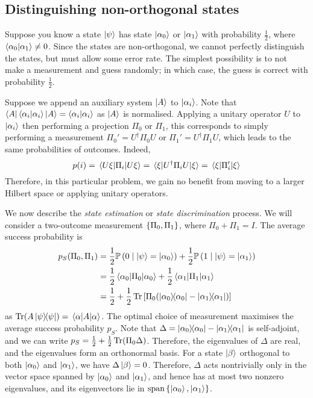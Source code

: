 \subsection{Distinguishing non-orthogonal states}
Suppose you know a state \( \ket{\psi} \) has state \( \ket{\alpha_0} \) or \( \ket{\alpha_1} \) with probability \( \frac{1}{2} \), where \( \ip{\alpha_0}{\alpha_1} \neq 0 \).
Since the states are non-orthogonal, we cannot perfectly distinguish the states, but must allow some error rate.
The simplest possibility is to not make a measurement and guess randomly; in which case, the guess is correct with probability \( \frac{1}{2} \).

Suppose we append an auxiliary system \( \ket{A} \) to \( \ket{\alpha_i} \).
Note that \( \bra{A}\bra{\alpha_i}\ket{\alpha_i}\ket{A} = \ip{\alpha_i}{\alpha_i} \) as \( \ket{A} \) is normalised.
Applying a unitary operator \( U \) to \( \ket{\alpha_i} \) then performing a projection \( \Pi_0 \) or \( \Pi_1 \), this corresponds to simply performing a measurement \( \Pi_0' = U^\dagger \Pi_0 U \) or \( \Pi_1' = U^\dagger \Pi_1 U \), which leads to the same probabilities of outcomes.
Indeed,
\[ p(i) = \ev{\Pi_i}{U\xi} = \ev{U^\dagger \Pi_i U}{\xi} = \ev{\Pi_i'}{\xi} \]
Therefore, in this particular problem, we gain no benefit from moving to a larger Hilbert space or applying unitary operators.

We now describe the \emph{state estimation} or \emph{state discrimination} process.
We will consider a two-outcome measurement \( \qty{\Pi_0, \Pi_1} \), where \( \Pi_0 + \Pi_1 = I \).
The average success probability is
\begin{align*}
    p_S(\Pi_0, \Pi_1) &= \frac{1}{2} \prob{0 \mid \ket{\psi} = \ket{\alpha_0}} + \frac{1}{2} \prob{1 \mid \ket{\psi} = \ket{\alpha_1}} \\
    &= \frac{1}{2}\ev{\Pi_0}{\alpha_0} + \frac{1}{2}\ev{\Pi_1}{\alpha_1} \\
    &= \frac{1}{2} + \frac{1}{2} \Tr \qty[\Pi_0 \qty(\op{\alpha_0}{\alpha_0} - \op{\alpha_1}{\alpha_1})]
\end{align*}
as \( \Tr(A\op{\psi}{\psi}) = \ev{A}{\alpha} \).
The optimal choice of measurement maximises the average success probability \( p_S \).
Note that \( \Delta = \op{\alpha_0}{\alpha_0} - \op{\alpha_1}{\alpha_1} \) is self-adjoint, and we can write \( p_S = \frac{1}{2} + \frac{1}{2} \Tr(\Pi_0 \Delta) \).
Therefore, the eigenvalues of \( \Delta \) are real, and the eigenvalues form an orthonormal basis.
For a state \( \ket{\beta} \) orthogonal to both \( \ket{\alpha_0} \) and \( \ket{\alpha_1} \), we have \( \Delta \ket{\beta} = 0 \).
Therefore, \( \Delta \) acts nontrivially only in the vector space spanned by \( \ket{\alpha_0} \) and \( \ket{\alpha_1} \), and hence has at most two nonzero eigenvalues, and its eigenvectors lie in \( \operatorname{span}\qty{\ket{\alpha_0}, \ket{\alpha_1}} \).

